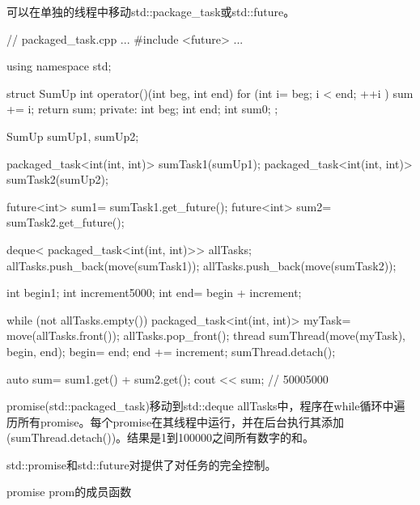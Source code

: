 可以在单独的线程中移动std::package\_task或std::future。


\begin{cpp}
// packaged_task.cpp
...
#include <future>
...

using namespace std;

struct SumUp{
	int operator()(int beg, int end){
		for (int i= beg; i < end; ++i ) sum += i;
		return sum;
	}
	private:
	int beg;
	int end;
	int sum{0};
};

SumUp sumUp1, sumUp2;

packaged_task<int(int, int)> sumTask1(sumUp1);
packaged_task<int(int, int)> sumTask2(sumUp2);

future<int> sum1= sumTask1.get_future();
future<int> sum2= sumTask2.get_future();

deque< packaged_task<int(int, int)>> allTasks;
allTasks.push_back(move(sumTask1));
allTasks.push_back(move(sumTask2));

int begin{1};
int increment{5000};
int end= begin + increment;

while (not allTasks.empty()){
	packaged_task<int(int, int)> myTask= move(allTasks.front());
	allTasks.pop_front();
	thread sumThread(move(myTask), begin, end);
	begin= end;
	end += increment;
	sumThread.detach();
}

auto sum= sum1.get() + sum2.get();
cout << sum; // 50005000
\end{cpp}

promise(std::packaged\_task)移动到std::deque allTasks中，程序在while循环中遍历所有promise。每个promise在其线程中运行，并在后台执行其添加(sumThread.detach())。结果是1到100000之间所有数字的和。


std::promise和std::future对提供了对任务的完全控制。

\begin{center}
promise prom的成员函数
\end{center}

